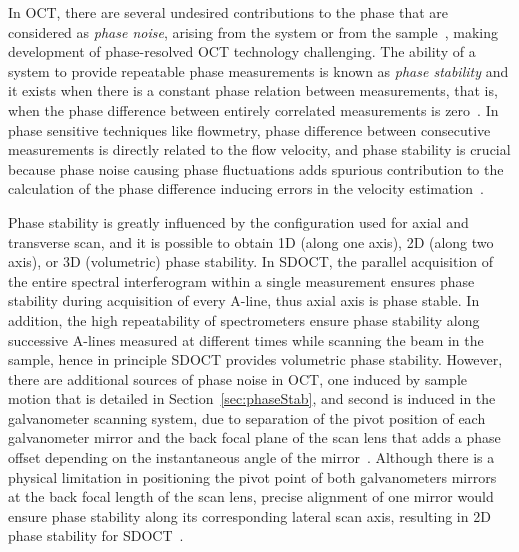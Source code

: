In OCT, there are several undesired contributions to the phase that are considered as \textit{phase noise}, arising from the system or from the sample~\cite{Vakoc2005_Phaseresolved, Shemonski2014_Stability}, making development of phase-resolved OCT technology challenging. The ability of a system to provide repeatable phase measurements is known as \textit{phase stability} and it exists when there is a constant phase relation between measurements, that is, when the phase difference between entirely correlated measurements is zero~\cite{Shemonski2014_Stability}. In phase sensitive techniques like flowmetry, phase difference between consecutive measurements is directly related to the flow velocity, and phase stability is crucial because phase noise causing phase fluctuations adds spurious contribution to the calculation of the phase difference inducing errors in the velocity estimation~\cite{White2003_vivo}.

Phase stability is greatly influenced by the configuration used for axial and transverse scan, and it is possible to obtain 1D (along one axis), 2D (along two axis), or 3D (volumetric) phase stability. In SDOCT, the parallel acquisition of the entire spectral interferogram within a single measurement ensures phase stability during acquisition of every A-line, thus axial axis is phase stable. In addition, the high repeatability of spectrometers ensure phase stability along successive A-lines measured at different times while scanning the beam in the sample, hence in principle SDOCT provides volumetric phase stability. However, there are additional sources of phase noise in OCT, one induced by sample motion that is detailed in Section~\ref{sec:phaseStab}, and second is induced in the galvanometer scanning system, due to separation of the pivot position of each galvanometer mirror and the back focal plane of the scan lens that adds a phase offset depending on the instantaneous angle of the mirror~\cite{Shemonski2014_Stability}. Although there is a physical limitation in positioning the pivot point of both galvanometers mirrors at the back focal length of the scan lens, precise alignment of one mirror would ensure phase stability along its corresponding lateral scan axis, resulting in 2D phase stability for SDOCT~\cite{Vakoc2009_Statistical}.

